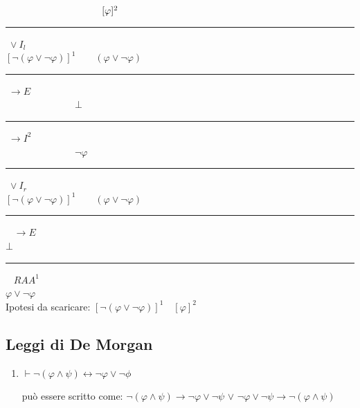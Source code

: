\documentclass[a4paper, 12pt]{book}
\begin{document}
{\begin{center}
\begin{minipage}[t]{0.45\textwidth}
      \(
      \hspace{3.5cm}[\varphi]^2
      \) \\[-0.5em]
      \hspace{4cm} \rule{2cm}{0.4pt} \(\; \lor I_l\)\\[-0.2em]
      \(
      [\lnot (\varphi \lor \lnot \varphi)]^1 \qquad (\varphi \lor \lnot \varphi)
      \) \\[-0.5em]
      \hspace{1cm} \rule{4.5cm}{0.4pt} \(\; \rightarrow E\)\\[-0.2em]
      \(
      \hspace{3cm}\bot
      \) \\[-0.5em]
      \hspace{3.4cm} \rule{2cm}{0.4pt} \(\; \rightarrow I^2\)\\[-0.5em]
      \(
      \hspace{3cm} \lnot \varphi
      \) \\[-0.5em]
      \hspace{3.4cm} \rule{2cm}{0.4pt} \(\; \lor I_r\)\\
      \(
      [\lnot(\varphi \lor \lnot \varphi)]^1 \qquad (\varphi \lor \lnot \varphi)
      \) \\[-0.5em]
      \hspace{1cm} \rule{4.5cm}{0.4pt} \(\;\;\; \rightarrow E\)\\
      \( \bot \)\\[-0.7em]
      \hspace{1cm} \rule{2cm}{0.4pt} \(\;\;\; RAA^1\)\\  
      \(
      \varphi \lor \lnot \varphi
      \) \\[1em]
      Ipotesi da scaricare: \([\lnot(\varphi \lor \lnot \varphi)]^1 \quad [\varphi]^2\)
    \end{minipage}
  \end{center}

  }


  \subsection*{Leggi di De Morgan}
  \begin{enumerate}
    \item $\vdash \lnot(\varphi \land \psi) \leftrightarrow \lnot \varphi \lor \lnot \phi$\par
    può essere scritto come: $\lnot(\varphi \land \psi) \rightarrow \lnot \varphi \lor \lnot \psi$ \quad \textbf{\large{$\lor$}} \quad $\lnot \varphi \lor \lnot \psi \rightarrow \lnot(\varphi \land \psi)$
  \end{enumerate}
\end{document}
